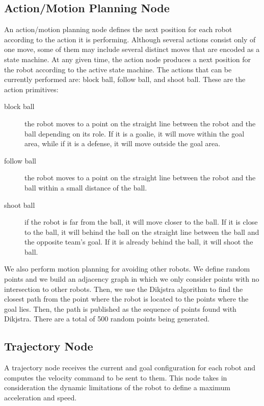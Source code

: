 \documentclass[]{llncs}
\newcommand{\TODO}[1]{{\textcolor{blue}{ToDo: {#1}}}}
\begin{document}
\subsection{Action/Motion Planning Node}
An action/motion planning node defines the next position for each robot according to the action it is performing. Although several actions consist only of one move, some of them may include several distinct moves that are encoded as a state machine. At any given time, the action node produces a next position for the robot according to the active state machine. The actions that can be currently performed are: block ball, follow ball, and shoot ball. These are the action primitives:

\begin{description}
	\item[block ball] the robot moves to a point on the straight line between the robot and the ball depending on its role. If it is a goalie, it will move within the goal area, while if it is a defense, it will move outside the goal area.
	\item[follow ball] the robot moves to a point on the straight line between the robot and the ball within a small distance of the ball.
	\item[shoot ball] if the robot is far from the ball, it will move closer to the ball. If it is close to the ball, it will behind the ball on the straight line between the ball and the opposite team's goal. If it is already behind the ball, it will shoot the ball.
\end{description}

We also perform motion planning for avoiding other robots. We define random points and we build an adjacency graph in which we only consider points with no intersection to other robots. Then, we use the Dikjstra algorithm to find the closest path from the point where the robot is located to the points where the goal lies. Then, the path is published as the sequence of points found with Dikjstra. There are a total of 500 random points being generated.

 
\subsection{Trajectory Node}
A trajectory node receives the current and goal configuration for each robot and computes the velocity command to be sent to them. This node takes in consideration the dynamic limitations of the robot to define a maximum acceleration and speed. 
\end{document}
